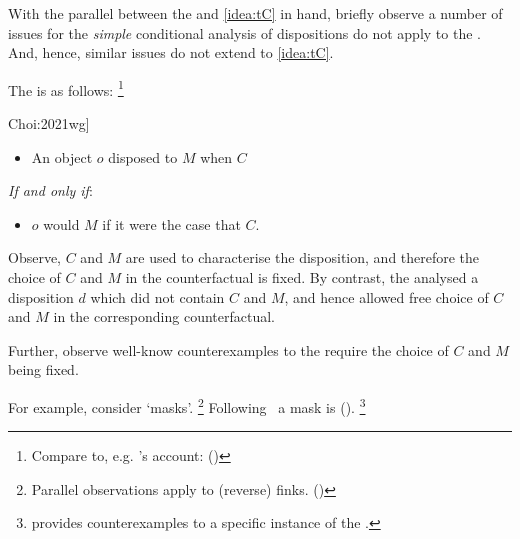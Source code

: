\begin{note}
  With the parallel between the \dBCAa{} and \autoref{idea:tC} in hand, briefly observe a number of issues for the \emph{simple} conditional analysis of dispositions do not apply to the \dBCAa{}.
  And, hence, similar issues do not extend to \autoref{idea:tC}.

  The \dSCA{} is as follows:%
  \footnote{
    Compare to, e.g. \citeauthor{Lewis:1997wg}'s account:
    (\citeyear[143]{Lewis:1997wg})
  }

  \begin{sketch}[The \dSCA{} --- \dSCAa{}, cf.\ \cite[\S1.2]{Choi:2021wg}]%
    \label{sketch:dSCA}
    \vspace{-\baselineskip}
    \begin{itemize}
    \item
      An object \(o\) disposed to \(M\) when \(C\)
    \end{itemize}
    \emph{If and only if}:
    \begin{itemize}
    \item
      \(o\) would \(M\) if it were the case that \(C\).
    \end{itemize}
    \vspace{-\baselineskip}
  \end{sketch}

  Observe, \(C\) and \(M\) are used to characterise the disposition, and therefore the choice of \(C\) and \(M\) in the counterfactual is fixed.
  By contrast, the \dBCAa{} analysed a disposition \(d\) which did not contain \(C\) and \(M\), and hence allowed free choice of \(C\) and \(M\) in the corresponding counterfactual.

  Further, observe well-know counterexamples to the \dSCAa{} require the choice of \(C\) and \(M\) being fixed.

  For example, consider `masks'.%
  \footnote{
    Parallel observations apply to (reverse) finks.
    (\cite{Martin:1994aa})
  }
  Following~\citeauthor{Clarke:2010aa} a mask is  (\citeyear[153]{Clarke:2010aa}).%
  \footnote{
    \cite{Johnston:1992aa} provides counterexamples to a specific instance of the \dBCAa{}.
  }


\end{note}
